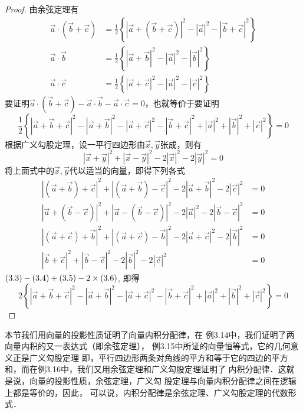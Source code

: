 \begin{proof}
    由余弦定理有
\[\begin{split}
    \vec{a}\cdot \left(\vec{b}+\vec{c}\right)&=\frac{1}{2}\left\{\left|\vec{a}+\left(\vec{b}+\vec{c}\right)\right|^2-\left|\vec{a}\right|^2-\left|\vec{b}+\vec{c}\right|^2\right\}  \\
    \vec{a}\cdot \vec{b}&=\frac{1}{2}\left\{\left|\vec{a}+\vec{b}\right|^2-\left|\vec{a}\right|^2-\left|\vec{b}\right|^2\right\}  \\
    \vec{a}\cdot \vec{c}&= \frac{1}{2}\left\{\left|\vec{a}+\vec{c}\right|^2-\left|\vec{a}\right|^2-\left|\vec{c}\right|^2\right\} 
\end{split}\]
要证明$\vec{a}\cdot \left(\vec{b}+\vec{c}\right)-\vec{a}\cdot \vec{b}-\vec{a}\cdot \vec{c}=0$，也就等价于要证明
\[\frac{1}{2}\left\{\left|\vec{a}+\vec{b}+\vec{c}\right|^2-\left|\vec{a}+\vec{b}\right|^2-\left|\vec{a}+\vec{c}\right|^2-\left|\vec{b}+\vec{c}\right|^2+\left|\vec{a}\right|^2+\left|\vec{b}\right|^2+\left|\vec{c}\right|^2\right\}=0\]
根据广义勾股定理，设一平行四边形由$\vec{x},\vec{y}$张成，则有
\[\left|\vec{x}+\vec{y}\right|^2+\left|\vec{x}-\vec{y}\right|^2-2|\vec{x}|^2-2|\vec{y}|^2=0\]
将上面式中的$\vec{x},\vec{y}$代以适当的向量，即得下列各式
\begin{align}
\left|\left(\vec{a}+\vec{b}\right)+\vec{c}\right|^2+\left|\left(\vec{a}+\vec{b}\right)-\vec{c}\right|^2-2\left|\vec{a}+\vec{b}\right|^2-2\left|\vec{c}\right|^2&=0\\
\left|\vec{a}+\left(\vec{b}-\vec{c}\right)\right|^2+\left|\vec{a}-\left(\vec{b}-\vec{c}\right)\right|^2-2\left|\vec{a}\right|^2-2\left|\vec{b}-\vec{c}\right|^2&=0\\
\left|\left(\vec{a}+\vec{c}\right)+\vec{b}\right|^2+\left|\left(\vec{a}+\vec{c}\right)-\vec{b}\right|^2-2\left|\vec{a}+\vec{c}\right|^2-2\left|\vec{b}\right|^2&=0\\
\left|\vec{b}+\vec{c}\right|^2+\left|\vec{b}-\vec{c}\right|^2-2\left|\vec{b}\right|^2-2\left|\vec{c}\right|^2&=0
\end{align}
$(3.3)-(3.4)+(3.5)-2\times(3.6)$, 即得
\[2\left\{\left|\vec{a}+\vec{b}+\vec{c}\right|^2-\left|\vec{a}+\vec{b}\right|^2-\left|\vec{a}+\vec{c}\right|^2-\left|\vec{b}+\vec{c}\right|^2+\left|\vec{a}\right|^2+\left|\vec{b}\right|^2+\left|\vec{c}\right|^2\right\}=0\]
\end{proof}

本节我们用向量的投影性质证明了向量内积分配律，在
例3.14中，我们证明了两向量内积的又一表达式（即余弦定理），
例3.15中所证的向量恒等式，它的几何意义正是广义勾股定理
即，平行四边形两条对角线的平方和等于它的四边的平方
和，而在例3.16中，我们又用余弦定理和广义勾股定理证明了
内积分配律．这就是说，向量的投影性质，余弦定理，广义勾
股定理与向量内积分配律之间在逻辑上都是等价的，因此，
可以说，内积分配律是余弦定理、广义勾股定理的代数形
式．

